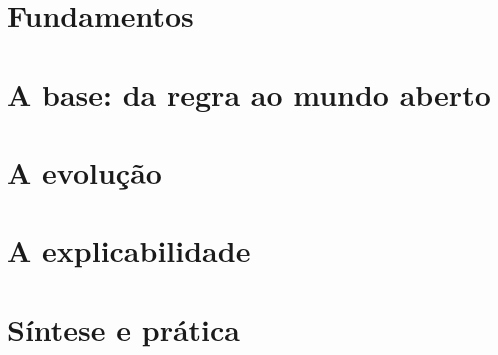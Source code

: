 \documentclass[11pt,a4paper,twoside,openright]{book}
\begin{document}
\cleardoublepage

\cleardoublepage


\mainmatter

\part{Fundamentos}\label{parte:fundamentos}







\part{A base: da regra ao mundo aberto}\label{parte:base}




\part{A evolução}\label{parte:evolucao}




\part{A explicabilidade}\label{parte:explicabilidade}




\part{Síntese e prática}\label{parte:sintese}




\appendix






\backmatter
\cleardoublepage
{}


\cleardoublepage
{}
\printindex

\cleardoublepage
{}
{}

\end{document}
